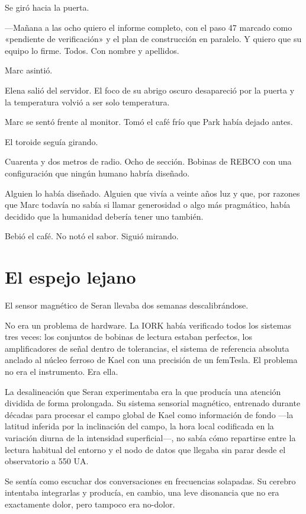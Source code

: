 \documentclass[11pt,a5paper,twoside]{book}
\begin{document}
Se giró hacia la puerta.

—Mañana a las ocho quiero el informe completo, con el paso 47 marcado como «pendiente de verificación» y el plan de construcción en paralelo. Y quiero que su equipo lo firme. Todos. Con nombre y apellidos.

Marc asintió.

Elena salió del servidor. El foco de su abrigo oscuro desapareció por la puerta y la temperatura volvió a ser solo temperatura.

Marc se sentó frente al monitor. Tomó el café frío que Park había dejado antes.

El toroide seguía girando.

Cuarenta y dos metros de radio. Ocho de sección. Bobinas de REBCO con una configuración que ningún humano habría diseñado.

Alguien lo había diseñado. Alguien que vivía a veinte años luz y que, por razones que Marc todavía no sabía si llamar generosidad o algo más pragmático, había decidido que la humanidad debería tener uno también.

Bebió el café. No notó el sabor. Siguió mirando.

\chapter{El espejo lejano}

El sensor magnético de Seran llevaba dos semanas descalibrándose.

No era un problema de hardware. La IORK había verificado todos los sistemas tres veces: los conjuntos de bobinas de lectura estaban perfectos, los amplificadores de señal dentro de tolerancias, el sistema de referencia absoluta anclado al núcleo ferroso de Kael con una precisión de un femTesla. El problema no era el instrumento. Era ella.

La desalineación que Seran experimentaba era la que producía una atención dividida de forma prolongada. Su sistema sensorial magnético, entrenado durante décadas para procesar el campo global de Kael como información de fondo —la latitud inferida por la inclinación del campo, la hora local codificada en la variación diurna de la intensidad superficial—, no sabía cómo repartirse entre la lectura habitual del entorno y el nodo de datos que llegaba sin parar desde el observatorio a 550 UA.

Se sentía como escuchar dos conversaciones en frecuencias solapadas. Su cerebro intentaba integrarlas y producía, en cambio, una leve disonancia que no era exactamente dolor, pero tampoco era no-dolor.
\end{document}
